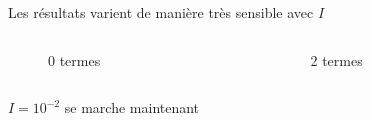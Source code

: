 \documentclass[10pt]{beamer}
\begin{document}
\begin{frame}{Les résultats varient de manière très sensible avec $I$}
    \begin{columns}
        \begin{column}{0.5\textwidth}
            \begin{figure}[h]
                \centering
                \scalebox{0.5}{}
                \caption{0 termes}
            \end{figure}
        \end{column}
        \begin{column}{0.5\textwidth}
            \begin{figure}[h]
                \centering
                \scalebox{0.5}{}
                \caption{2 termes}
            \end{figure}
        \end{column}
    \end{columns}
    $I = 10^{-2}$ se marche maintenant
\end{frame}




\end{document}
